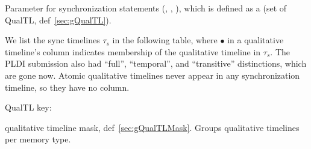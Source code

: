 
Parameter for synchronization statements (, , ), which is defined as a  (set of \textsf{QualTL}, def~\ref{sec:gQualTL}).

We list the sync timelines $\tau_s$ in the following table, where $\bullet$ in a qualitative timeline's column indicates membership of the qualitative timeline in $\tau_s$.
The PLDI submission also had ``full'', ``temporal'', and ``transitive'' distinctions, which are gone now.
Atomic qualitative timelines never appear in any synchronization timeline, so they have no column.

{
\setlength{\tabcolsep}{2pt}
\small

}

\textsf{QualTL} key:



 qualitative timeline mask, def~\ref{sec:gQualTLMask}. Groups qualitative timelines per memory type.

